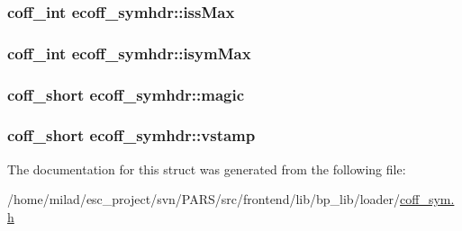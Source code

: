 \label{structecoff__symhdr_a381c27bb3c0fadffe21d1e0fe5944fdd}
\hypertarget{structecoff__symhdr_acfc7e74a0ebb9528528dd9f30987c8ed}{
\subsubsection[{issMax}]{\setlength{\rightskip}{0pt plus 5cm}coff\_\-int {\bf ecoff\_\-symhdr::issMax}}}
\label{structecoff__symhdr_acfc7e74a0ebb9528528dd9f30987c8ed}
\hypertarget{structecoff__symhdr_a5d15acd3562ecad9acd13852e1d04b5a}{
\subsubsection[{isymMax}]{\setlength{\rightskip}{0pt plus 5cm}coff\_\-int {\bf ecoff\_\-symhdr::isymMax}}}
\label{structecoff__symhdr_a5d15acd3562ecad9acd13852e1d04b5a}
\hypertarget{structecoff__symhdr_ae9efacde79d203a1824cfde09a5c6500}{
\subsubsection[{magic}]{\setlength{\rightskip}{0pt plus 5cm}coff\_\-short {\bf ecoff\_\-symhdr::magic}}}
\label{structecoff__symhdr_ae9efacde79d203a1824cfde09a5c6500}
\hypertarget{structecoff__symhdr_a0dbd0fac495bc661ebe3383552013726}{
\subsubsection[{vstamp}]{\setlength{\rightskip}{0pt plus 5cm}coff\_\-short {\bf ecoff\_\-symhdr::vstamp}}}
\label{structecoff__symhdr_a0dbd0fac495bc661ebe3383552013726}


The documentation for this struct was generated from the following file:\begin{DoxyCompactItemize}
\item 
/home/milad/esc\_\-project/svn/PARS/src/frontend/lib/bp\_\-lib/loader/\hyperlink{coff__sym_8h}{coff\_\-sym.h}\end{DoxyCompactItemize}
